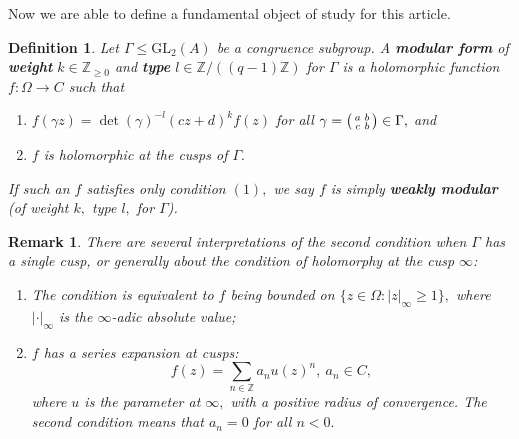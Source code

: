 \documentclass[11pt]{amsart}
\newtheorem{definition}[theorem]{Definition}
\newtheorem{remark}[theorem]{Remark}
\theoremstyle{definition}
\newenvironment{psmallmatrix}
{\left(\begin{smallmatrix}}
	{\end{smallmatrix}\right)}
\numberwithin{equation}{section}
\newcommand{\GL}{\mathrm{GL}} 	%
\newcommand{\bbZ}{\mathbb{Z}}		%
\begin{document}
		Now we are able to define a fundamental object of study for this article. 
		
		\begin{definition}\cite[Definition $(3.1)$]{Gekeler-Curves}
		\label{def: Drinfeld modular form}
			Let $\Gamma\leq \GL_2(A)$ be a congruence subgroup. A \textbf{modular form} of \textbf{weight} $k\in \bbZ_{\geq0}$ and \textbf{type} $l\in \bbZ/((q-1) \bbZ)$ for $\Gamma$ is a holomorphic function $f:\Omega\to C$ such that 
			\begin{enumerate}
				\item $f(\gamma z)=\det(\gamma)^{-l}(cz+d)^kf(z)$ for all $\displaystyle{\gamma=\begin{psmallmatrix}a&b\\c&b\end{psmallmatrix}\in \Gamma},$ and
				\item $f$ is holomorphic at the cusps of $\Gamma.$
			\end{enumerate}
			If such an $f$ satisfies only condition $(1),$ we say $f$ is simply \textbf{weakly modular} (of weight $k,$ type $l,$ for $\Gamma$).
		\end{definition}
		
		\begin{remark}
			There are several interpretations of the second condition when $\Gamma$ has a single cusp, or generally about the condition of holomorphy at the cusp $\infty$:
			\begin{enumerate}
				\item \cite[$(2.2.\mathrm{iii})$]{Gekeler-Invariants} The condition is equivalent to $f$ being bounded on $\{z\in \Omega:|z|_{\infty}\geq 1\},$ where $|\cdot|_{\infty}$ is the $\infty$-adic absolute value; 
				\item \cite[Definition $3.5.(\mathrm{iii})$]{Gekeler-survey-Drinfeld-modular-forms} $f$ has a series expansion at cusps: 
				\[f(z)=\sum_{n\in \bbZ}a_nu(z)^n, ~a_n\in C,\]
				where $u$ is the parameter at $\infty,$ with a positive radius of convergence. The second condition means that $a_n=0$ for all $n<0.$
			\end{enumerate}
		\end{remark}
		
\end{document}
